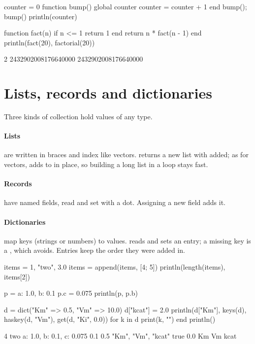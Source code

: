 \documentclass[11pt,a4paper,openany]{report}
\begin{document}
{{\begin{axon}
counter = 0
function bump()
  global counter
  counter = counter + 1
end
bump(); bump()
println(counter)

function fact(n)
  if n <= 1 return 1 end
  return n * fact(n - 1)
end
println(fact(20), factorial(20))
\end{axon}
\begin{axonout}
2
2432902008176640000 2432902008176640000
\end{axonout}

\section{Lists, records and dictionaries}\label{sec:lists}

Three kinds of collection hold values of any type.

\paragraph{Lists} are written in braces and index like vectors.
 returns a new list with  added; as for
vectors,  adds to  in place, so building a long
list in a loop stays fast.

\paragraph{Records} have named fields, read and set with a dot. Assigning a new
field adds it.

\paragraph{Dictionaries} map keys (strings or numbers) to values. 
reads and sets an entry; a missing key is a , which
 avoids. Entries keep the order they were added in.

\begin{axon}
items = {1, "two", 3.0}
items = append(items, [4; 5])
println(length(items), items[2])

p = {a: 1.0, b: 0.1}
p.c = 0.075
println(p, p.b)

d = dict("Km" => 0.5, "Vm" => 10.0)
d["kcat"] = 2.0
println(d["Km"], keys(d), haskey(d, "Vm"), get(d, "Ki", 0.0))
for k in d
  print(k, "")
end
println()
\end{axon}
\begin{axonout}
4 two
{a: 1.0, b: 0.1, c: 0.075} 0.1
0.5 {"Km", "Vm", "kcat"} true 0.0
Km Vm kcat
\end{axonout}

}}
\end{document}
